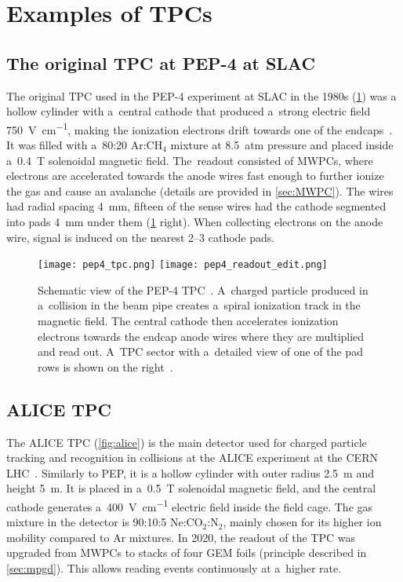 	\section{Examples of TPCs}
		\subsection{The original TPC at PEP-4 at SLAC}
			The original \ac{TPC} used in the PEP-4 experiment at SLAC in the 1980s (\cref{fig:pep4}) was a  hollow cylinder with a~central cathode that produced a~strong electric field \qty{750}{\V\per\cm}, making the ionization electrons drift towards one of the endcaps~\cite{pep4-2}. It was filled with a~80:20 Ar:CH$_4$ mixture at \qty{8.5}{atm} pressure and placed inside a~\qty{0.4}{\tesla} solenoidal magnetic field. The~readout consisted of \acp{MWPC}, where electrons are accelerated towards the anode wires fast enough to further ionize the gas and cause an avalanche (details are provided in \cref{sec:MWPC}). The wires had radial spacing \qty{4}{\mm}, fifteen of the sense wires had the cathode segmented into  pads \qty{4}{\mm} under them (\cref{fig:pep4} right). When collecting electrons on the anode wire, signal is induced on the nearest \numrange{2}{3} cathode pads.
			
			\begin{figure}
				\centering
				\texttt{[image: pep4\_tpc.png]}
				\hfill
				\texttt{[image: pep4\_readout\_edit.png]}
				\caption{Schematic view of the PEP-4 \ac{TPC}~\cite{pep4}. A~charged particle produced in a~collision in the beam pipe creates a~spiral ionization track in the magnetic field. The central cathode then accelerates ionization electrons towards the endcap anode wires where they are multiplied and read out. A~\ac{TPC} sector with a~detailed view of one of the pad rows is shown on the right~\cite{pep4_readout}.}
				\label{fig:pep4}
			\end{figure}
		
		\subsection{ALICE TPC}
			The ALICE \ac{TPC} (\cref{fig:alice}) is the main detector used for charged particle tracking and recognition in collisions at the ALICE experiment at the CERN LHC~\cite{ALICE}. Similarly to PEP, it is a hollow cylinder with outer radius \qty{2.5}{\m} and height \qty{5}{\m}. It is placed in a~\qty{0.5}{\tesla} solenoidal magnetic field, and the central cathode generates a~\qty{400}{\V\per\cm} electric field inside the field cage. The gas mixture in the detector is 90:10:5 Ne:CO$_2$:N$_2$, mainly chosen for its higher ion mobility compared to Ar mixtures. In 2020, the readout of the \ac{TPC} was upgraded from \acp{MWPC} to stacks of four \ac{GEM} foils (principle described in \cref{sec:mpgd}). This allows reading events continuously at a~higher rate.
			
